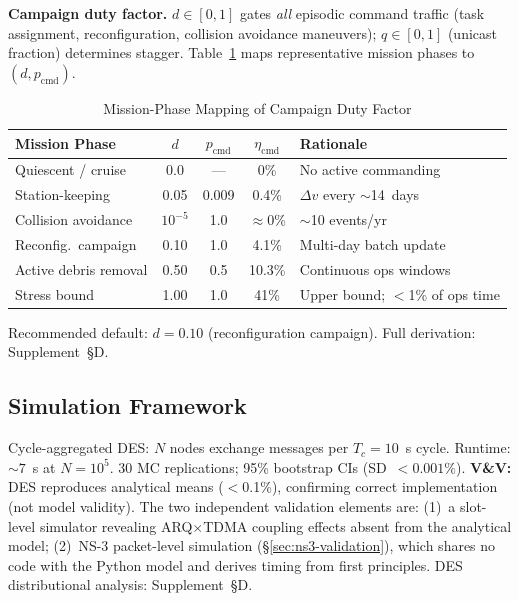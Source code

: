 \documentclass[journal]{IEEEtran}
\begin{document}
\textbf{Campaign duty factor.} $d \in [0,1]$ gates \emph{all} episodic command traffic (task assignment, reconfiguration, collision avoidance maneuvers); $q \in [0,1]$ (unicast fraction) determines stagger. Table~\ref{tab:mission_phase_d} maps representative mission phases to $(d, p_{\text{cmd}})$.

\begin{table}[t]
    \centering
    \caption{Mission-Phase Mapping of Campaign Duty Factor}
    \label{tab:mission_phase_d}
    \footnotesize
    \begin{tabular}{@{}lcccl@{}}
        \toprule
        \textbf{Mission Phase} & $d$ & $p_{\text{cmd}}$ & $\eta_{\text{cmd}}$ & \textbf{Rationale} \\
        \midrule
        Quiescent / cruise & 0.0 & --- & 0\% & No active commanding \\
        Station-keeping & 0.05 & 0.009 & 0.4\% & $\Delta v$ every ${\sim}$14~days \\
        Collision avoidance & $10^{-5}$ & 1.0 & $\approx$0\% & ${\sim}$10 events/yr \\
        Reconfig.\ campaign & 0.10 & 1.0 & 4.1\% & Multi-day batch update \\
        Active debris removal & 0.50 & 0.5 & 10.3\% & Continuous ops windows \\
        Stress bound & 1.00 & 1.0 & 41\% & Upper bound; $<$1\% of ops time \\
        \bottomrule
    \end{tabular}
\end{table}

\noindent Recommended default: $d = 0.10$ (reconfiguration campaign). Full derivation: Supplement~\S D.

\subsection{Simulation Framework}

Cycle-aggregated DES: $N$ nodes exchange messages per $T_c = 10$~s cycle. Runtime: ${\sim}7$~s at $N = 10^5$. 30 MC replications; 95\% bootstrap CIs (SD~$< 0.001\%$). \textbf{V\&V:} DES reproduces analytical means ($<$0.1\%), confirming correct implementation (not model validity). The two independent validation elements are: (1)~a slot-level simulator revealing ARQ$\times$TDMA coupling effects absent from the analytical model; (2)~NS-3 packet-level simulation (\S\ref{sec:ns3-validation}), which shares no code with the Python model and derives timing from first principles. DES distributional analysis: Supplement~\S D.
\end{document}

